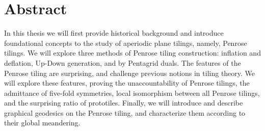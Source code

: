 \chapter*{Abstract}

In this thesis we will first provide historical background and introduce foundational concepts to the study of aperiodic plane tilings, namely, Penrose tilings. We will explore three methods of Penrose tiling construction: inflation and deflation, Up-Down generation, and by Pentagrid duals. The features of the Penrose tiling are surprising, and challenge previous notions in tiling theory. We will explore these features, proving the unaccountability of Penrose tilings, the admittance of five-fold symmetries, local isomorphism between all Penrose tilings, and the surprising ratio of prototiles. Finally, we will introduce and describe graphical geodesics on the Penrose tiling, and characterize them according to their global meandering.
